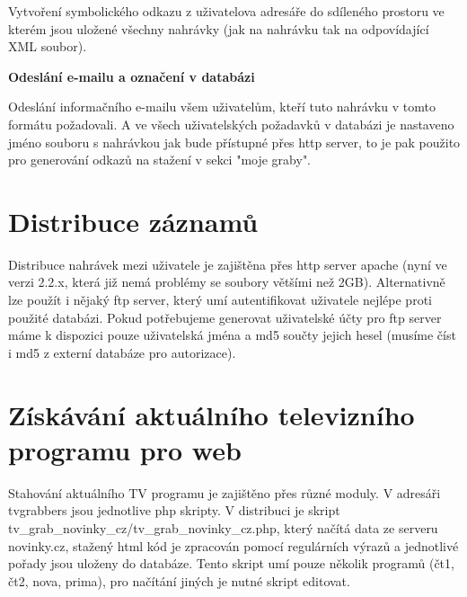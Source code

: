 Vytvoření symbolického odkazu z uživatelova adresáře do sdíleného prostoru ve kterém jsou uložené všechny nahrávky (jak na nahrávku tak na odpovídající XML soubor).

\vspace{10pt}

\textbf{Odeslání e-mailu a označení v databázi}

Odeslání informačního e-mailu všem uživatelům, kteří tuto nahrávku v tomto formátu požadovali. A ve všech uživatelských požadavků v databázi je nastaveno jméno souboru s nahrávkou jak bude přístupné přes http server, to je pak použito pro generování odkazů na stažení v sekci "moje graby".

\vspace{10pt}

\section{Distribuce záznamů}

\vspace{10pt}

Distribuce nahrávek mezi uživatele je zajištěna přes http server apache (nyní ve verzi 2.2.x, která již nemá problémy se soubory většími než 2GB). Alternativně lze použít i nějaký ftp server, který umí autentifikovat uživatele nejlépe proti použité databázi. Pokud potřebujeme generovat uživatelské účty pro ftp server máme k dispozici pouze uživatelská jména a md5 součty jejich hesel (musíme číst i md5 z externí databáze pro autorizace). 

\vspace{10pt}

\section{Získávání aktuálního televizního programu pro web}

\vspace{10pt}

Stahování aktuálního TV programu je zajištěno přes různé moduly. V adresáři tvgrabbers jsou jednotlive php skripty. V distribuci je skript tv\_grab\_novinky\_cz/tv\_grab\_novinky\_cz.php, který načítá data ze serveru novinky.cz, stažený html kód je zpracován pomocí regulárních výrazů a jednotlivé pořady jsou uloženy do databáze. Tento skript umí pouze několik programů (čt1, čt2, nova, prima), pro načítání jiných je nutné skript editovat.

\vspace{10pt}

